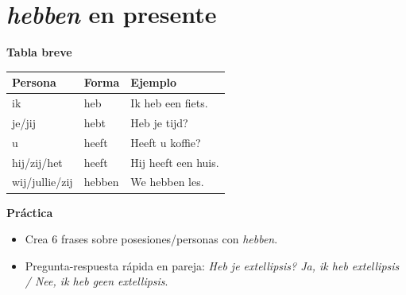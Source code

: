 \section{\textit{hebben} en presente}
\textbf{Tabla breve}
\begin{center}
\begin{tabular}{lll}
\toprule
Persona & Forma & Ejemplo \\
\midrule
ik & heb & Ik heb een fiets. \\
je/jij & hebt & Heb je tijd? \\
u & heeft & Heeft u koffie? \\
hij/zij/het & heeft & Hij heeft een huis. \\
wij/jullie/zij & hebben & We hebben les. \\
\bottomrule
\end{tabular}
\end{center}

\textbf{Práctica}
\begin{itemize}[leftmargin=*]
  \item Crea 6 frases sobre posesiones/personas con \textit{hebben}.
  \item Pregunta-respuesta rápida en pareja: \textit{Heb je	extellipsis{}? Ja, ik heb	extellipsis{} / Nee, ik heb geen	extellipsis{}}.
\end{itemize}

